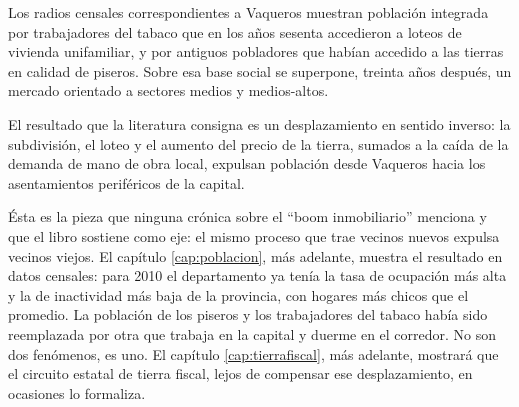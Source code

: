 Los radios censales correspondientes a Vaqueros muestran población integrada por trabajadores del tabaco que en los años sesenta accedieron a loteos de vivienda unifamiliar, y por antiguos pobladores que habían accedido a las tierras en calidad de piseros. Sobre esa base social se superpone, treinta años después, un mercado orientado a sectores medios y medios-altos.

El resultado que la literatura consigna es un desplazamiento en sentido inverso: la subdivisión, el loteo y el aumento del precio de la tierra, sumados a la caída de la demanda de mano de obra local, expulsan población desde Vaqueros hacia los asentamientos periféricos de la capital.

Ésta es la pieza que ninguna crónica sobre el ``boom inmobiliario'' menciona y que el libro sostiene como eje: el mismo proceso que trae vecinos nuevos expulsa vecinos viejos. El capítulo \ref{cap:poblacion}, más adelante, muestra el resultado en datos censales: para 2010 el departamento ya tenía la tasa de ocupación más alta y la de inactividad más baja de la provincia, con hogares más chicos que el promedio. La población de los piseros y los trabajadores del tabaco había sido reemplazada por otra que trabaja en la capital y duerme en el corredor. No son dos fenómenos, es uno. El capítulo \ref{cap:tierrafiscal}, más adelante, mostrará que el circuito estatal de tierra fiscal, lejos de compensar ese desplazamiento, en ocasiones lo formaliza.
